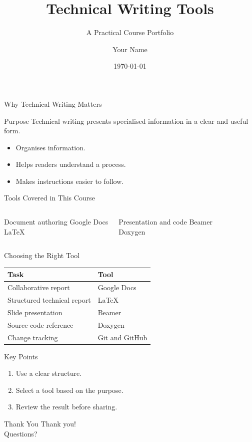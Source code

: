 \documentclass[aspectratio=169,11pt]{beamer}
\title{Technical Writing Tools}
\subtitle{A Practical Course Portfolio}
\author{Your Name}
\institute{Department / University}
\date{\today}
\begin{document}
\begin{frame}
  \titlepage
\end{frame}

\begin{frame}{Why Technical Writing Matters}
\begin{block}{Purpose}
Technical writing presents specialised information in a clear and useful form.
\end{block}
\begin{itemize}
  \item Organises information.
  \item Helps readers understand a process.
  \item Makes instructions easier to follow.
\end{itemize}
\end{frame}

\begin{frame}{Tools Covered in This Course}
\begin{columns}[T,onlytextwidth]
  \begin{block}{Document authoring}
    Google Docs\\
    LaTeX
  \end{block}
  \begin{block}{Presentation and code}
    Beamer\\
    Doxygen
  \end{block}
\end{columns}
\end{frame}

\begin{frame}{Choosing the Right Tool}
\begin{tabular}{ll}
\toprule
Task & Tool\\
\midrule
Collaborative report & Google Docs\\
Structured technical report & LaTeX\\
Slide presentation & Beamer\\
Source-code reference & Doxygen\\
Change tracking & Git and GitHub\\
\bottomrule
\end{tabular}
\end{frame}

\begin{frame}{Key Points}
\begin{enumerate}
  \item Use a clear structure.
  \item Select a tool based on the purpose.
  \item Review the result before sharing.
\end{enumerate}
\end{frame}

\begin{frame}{Thank You}
\centering
{\Huge Thank you!}\\[0.5cm]
Questions?
\end{frame}
\end{document}
